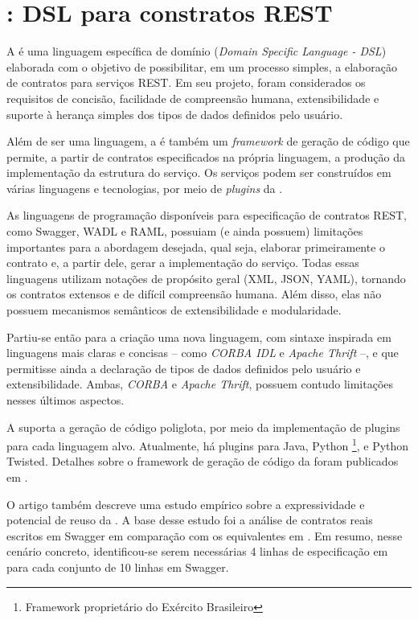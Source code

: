 \section{\neoidl{}: DSL para constratos REST}


A \neoidl{} é uma linguagem específica de domínio (\textit{Domain Specific
Language - DSL}) elaborada com o objetivo de possibilitar, em um processo
simples, a elaboração de contratos para serviços REST. Em seu projeto, 
foram considerados os requisitos de concisão, facilidade de compreensão humana,
extensibilidade e suporte à herança simples dos tipos de dados definidos pelo
usuário.

Além de ser uma linguagem, a \neoidl{} é também um \textit{framework} de geração
de código que permite, a partir de contratos especificados na própria
linguagem, a produção da implementação da estrutura do serviço. Os serviços
podem ser construídos em várias linguagens e tecnologias, por meio
de \textit{plugins} da \neoidl{}.

As linguagens de programação disponíveis para especificação de
contratos REST, como Swagger\cite{swaggerSite}, WADL\cite{hadley2006web} e
RAML\cite{RAML}, possuiam (e ainda possuem) limitações importantes para a
abordagem desejada, qual seja, elaborar primeiramente o contrato e, a
partir dele, gerar a implementação do serviço. Todas essas linguagens utilizam
notações de propósito geral (XML\cite{XML}, JSON\cite{JSon}, YAML\cite{YAML}),
tornando os contratos extensos e de difícil compreensão humana. Além disso,
elas não possuem mecanismos semânticos de extensibilidade e modularidade.

Partiu-se então para a criação uma nova linguagem, com sintaxe
inspirada em linguagens mais claras e concisas -- como \emph{CORBA
IDL}\texttrademark \cite{corba} e \emph{Apache
Thrift}\texttrademark\cite{thrift} --, e que permitisse ainda a declaração de
tipos de dados definidos pelo usuário e extensibilidade. Ambas, \emph{CORBA} e
\emph{Apache Thrift}, possuem contudo limitações nesses últimos aspectos. 

A \neoidl{} suporta a geração de código poliglota, por meio da implementação de
plugins \neoidl{} para cada linguagem alvo. Atualmente, há plugins para Java,
Python \neocortex{}\footnote{Framework proprietário do Exército Brasileiro},
e Python Twisted. Detalhes sobre o
framework de geração de código da \neoidl{} foram publicados em
\cite{lima2015neoidl}. 

O artigo \cite{lima2015neoidl} também descreve uma estudo empírico sobre a
expressividade e potencial de reuso da \neoidl{}. A base desse estudo foi a
análise de contratos reais escritos em Swagger em comparação com os equivalentes
em \neoidl{}. Em resumo, nesse cenário concreto, identificou-se serem
necessárias 4 linhas de especificação em \neoidl{} para cada conjunto de 10
linhas em Swagger.

